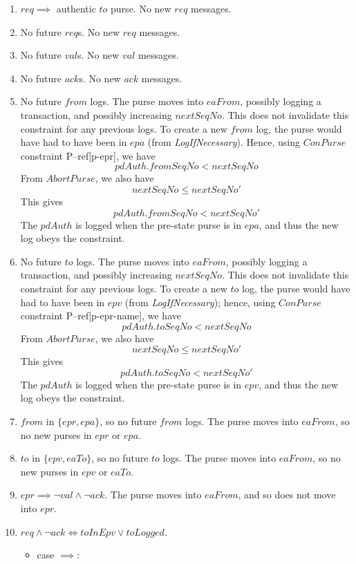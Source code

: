 \renewcommand{\labelenumi}{B--\theenumi}
\begin{enumerate}
\item $req \implies$ authentic $to$ purse.  No new $req$ messages.
\item No future $req$s.  No new $req$ messages.
\item No future $val$s.  No new $val$ messages.
\item No future $ack$s.  No new $ack$ messages.
\item No future $from$ logs.  The purse moves into $eaFrom$, possibly
  logging a transaction, and possibly increasing $nextSeqNo$.  This
  does not invalidate this constraint for any previous logs.  To
  create a new $from$ log, the purse would have had to have been in
  $epa$ (from {\it LogIfNecessary}).  Hence, using $ConPurse$
  constraint P--ref[p-epr], we have
  \[
  pdAuth.fromSeqNo < nextSeqNo
  \]
  From $AbortPurse$,  we also have
  \[
  nextSeqNo \leq nextSeqNo'
  \]
  This gives
  \[
  pdAuth.fromSeqNo < nextSeqNo'
  \]
  The $pdAuth$ is logged when the pre-state purse is in $epa$, and
  thus the new log obeys the constraint.

\item No future $to$ logs.  The purse moves into $eaFrom$, possibly
  logging a transaction, and possibly increasing $nextSeqNo$.  This
  does not invalidate this constraint for any previous logs.  To
  create a new $to$ log, the purse would have had to have been in
  $epv$ (from {\it LogIfNecessary}); hence, using $ConPurse$
  constraint P--ref[p-epr-name], we have
  \[
  pdAuth.toSeqNo < nextSeqNo
  \]
  From $AbortPurse$,  we also have
  \[
  nextSeqNo \leq nextSeqNo'
  \]
  This gives
  \[
  pdAuth.toSeqNo < nextSeqNo'
  \]
  The $pdAuth$ is logged when the pre-state purse is in $epv$, and
  thus the new log obeys the constraint.

\item $from$ in $\{epr,epa\}$, so no future $from$ logs.  The purse
  moves into $eaFrom$, so no new purses in $epr$ or $epa$.
\item $to$ in $\{epv,eaTo\}$, so no future $to$ logs.  The purse
  moves into $eaFrom$, so no new purses in $epv$ or $eaTo$.

\item $epr \implies \lnot val \land \lnot ack$.  The purse moves into
  $eaFrom$, and so does not move into $epr$.

\item $req \land \lnot ack \iff toInEpv \lor toLogged$.
  \begin{itemize}
  \item case $\implies$:


\end{itemize}
\end{enumerate}
